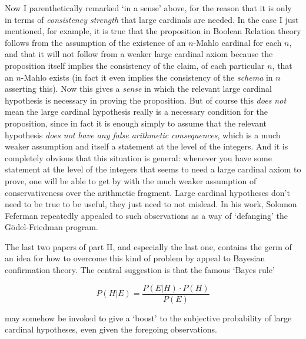 \documentclass{amsart}
\theoremstyle{definition}
\begin{document}
Now I parenthetically remarked `in a sense' above, for the reason that
it is only in terms of \emph{consistency strength} that large cardinals are needed. 
In the case I just mentioned, for example, 
it is true that the proposition in Boolean Relation theory 
follows from the assumption of the existence of an $n$-Mahlo cardinal for each $n$, 
and that it will not follow from a weaker large cardinal axiom because the proposition 
itself implies the consistency of the claim, of each particular $n$, that an $n$-Mahlo 
exists (in fact it even implies the consistency of the \emph{schema} in $n$ asserting this).
Now this gives a \emph{sense} in which the relevant large cardinal hypothesis is necessary
in proving the proposition.  But 
of course this \emph{does not} mean the large cardinal hypothesis really is
a necessary condition for the proposition, since in fact it is 
enough simply to assume that the relevant hypothesis
\emph{does not have any false arithmetic consequences}, which is a much weaker 
assumption and itself a statement at the level of the integers. 
And it is completely obvious that this situation is general: whenever you have 
some statement at the level of the integers that seems to need a large cardinal 
axiom to prove, one will be able to get by with the much weaker assumption of 
conservativeness over the arithmetic fragment. Large cardinal hypotheses don't need
to be true to be useful, they just need to not mislead.
In his work, Solomon Feferman repeatedly appealed to such observations 
as a way of `defanging' the G\"odel-Friedman program.

The last two papers of part II, and especially the last one, contains the germ
of an idea for how to overcome this kind of problem by appeal to Bayesian 
confirmation theory. The central suggestion is that the famous `Bayes rule'

\begin{equation}
P(H|E) = \frac{P(E|H)\cdot P(H)}{P(E)}
\end{equation}

may somehow be invoked to give a `boost' to the subjective probability 
of large cardinal hypotheses, even given the foregoing observations.
\end{document}
